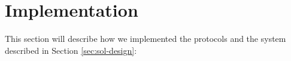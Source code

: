 \section{Implementation}\label{sec:implementation}

This section will describe how we implemented the protocols and the system
described in Section \ref{sec:sol-design}:




%




